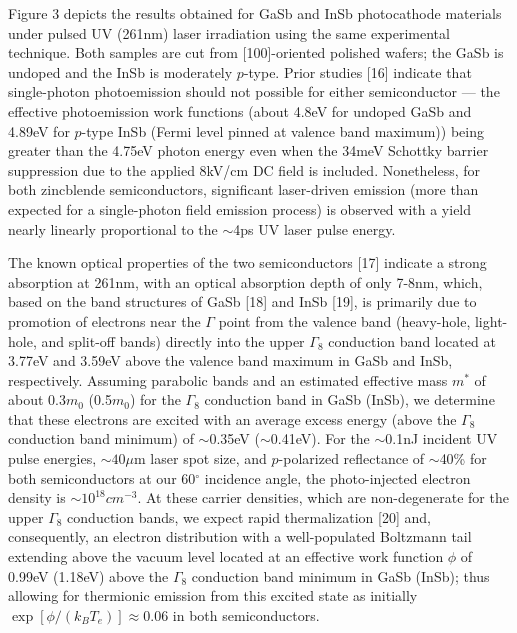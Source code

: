 Figure 3 depicts the results obtained for GaSb and InSb photocathode materials under pulsed UV (261nm) laser irradiation using the same experimental technique.
Both samples are cut from [100]-oriented polished wafers; the GaSb is undoped and the InSb is moderately $p$-type.
Prior studies [16] indicate that single-photon photoemission should not possible for either semiconductor --- the effective photoemission work functions (about 4.8eV for undoped GaSb and 4.89eV for $p$-type InSb (Fermi level pinned at valence band maximum)) being greater than the 4.75eV photon energy even when the 34meV Schottky barrier suppression due to the applied 8kV/cm DC field is included\cite{dowell_quantum_2009}.
Nonetheless, for both zincblende semiconductors, significant laser-driven emission (more than expected for a single-photon field emission process) is observed with a yield nearly linearly proportional to the $\sim$4ps UV laser pulse energy.

The known optical properties of the two semiconductors [17] indicate a strong absorption at 261nm, with an optical absorption depth of only 7-8nm, which, based on the band structures of GaSb [18] and InSb [19], is primarily due to promotion of electrons near the $\Gamma$ point from the valence band (heavy-hole, light-hole, and split-off bands) directly into the upper $\Gamma_8$ conduction band located at 3.77eV and 3.59eV above the valence band maximum in GaSb and InSb, respectively.
Assuming parabolic bands and an estimated effective mass $m^*$ of about 0.3$m_0$ (0.5$m_0$) for the $\Gamma_8$ conduction band in GaSb (InSb), we determine that these electrons are excited with an average excess energy (above the $\Gamma_8$ conduction band minimum) of $\sim$0.35eV ($\sim$0.41eV).
For the $\sim$0.1nJ incident UV pulse energies, $\sim40\mu$m laser spot size, and $p$-polarized reflectance of $\sim$40\% for both semiconductors at our 60$^{\circ}$ incidence angle, the photo-injected electron density is $\sim10^{18}cm^{-3}$.
At these carrier densities, which are non-degenerate for the upper $\Gamma_8$ conduction bands, we expect rapid thermalization [20] and, consequently, an electron distribution with a well-populated Boltzmann tail extending above the vacuum level located at an effective work function $\phi$ of 0.99eV (1.18eV) above the $\Gamma_8$ conduction band minimum in GaSb (InSb); thus allowing for thermionic emission from this excited state as initially $\exp[\phi/(k_B T_e)] \approx 0.06$ in both semiconductors.  

